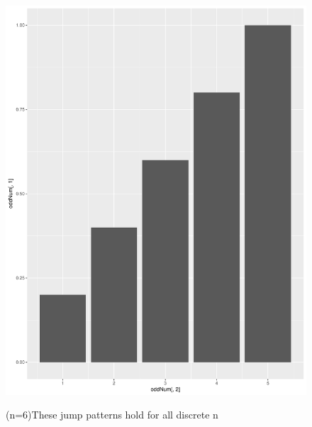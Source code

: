 \documentclass[11pt]{article}
\begin{document}
\begin{enumerate}
\begin{enumerate}
\begin{figure}[H]
		\includegraphics[scale=.4]{discreteOdd.pdf}
	\end{figure}
	\begin{figure}[H]
		\centering
		\caption{(n=6)These jump patterns hold for all discrete n}

\end{figure}
\end{enumerate}
\end{enumerate}
\end{document}
